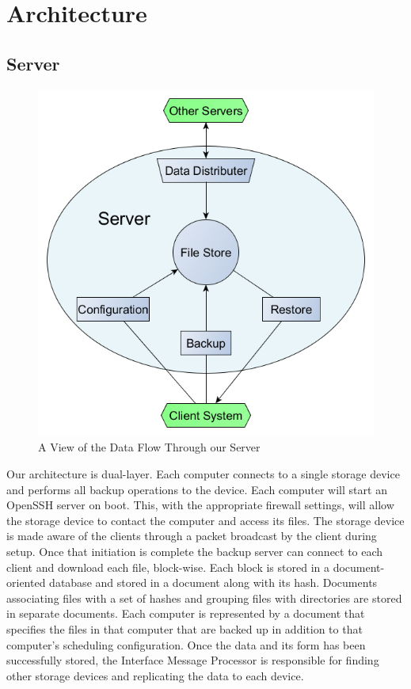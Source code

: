 \chapter{Architecture}
\section{Server}

\begin{figure}[hb]
\centering
\includegraphics[scale=0.5]{images/architechure-diagram2.png}
\caption{A View of the Data Flow Through our Server}
\end{figure}

Our architecture is dual-layer. Each computer connects to a single storage
device and performs all backup operations to the device. Each computer will start
an OpenSSH server on boot. This, with the appropriate firewall settings, will
allow the storage device to contact the computer and access its files. The
storage device is made aware of the clients through a packet broadcast by the
client during setup. Once that initiation is complete the backup server can
connect to each client and download each file, block-wise. Each block is stored
in a document-oriented database and stored in a document along with its hash.
Documents associating files with a set of hashes and grouping files with
directories are stored in separate documents. Each computer is represented by a
document that specifies the files in that computer that are backed up in
addition to that computer's scheduling configuration. Once the data and its form
has been successfully stored, the Interface Message Processor is responsible for
finding other storage devices and replicating the data to each device.

